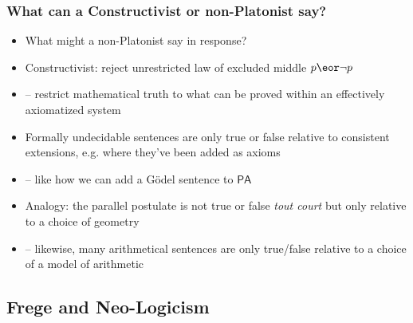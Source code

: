 


\begin{frame}
\frametitle{What can a Constructivist or non-Platonist say?}

\begin{itemize}[<+->]


\item What might a non-Platonist say in response?

\item Constructivist: reject unrestricted law of excluded middle $p \eor \neg p$
\item[] -- restrict mathematical truth to what can be proved within an effectively axiomatized system

\item Formally undecidable sentences are only true or false relative to consistent extensions, e.g. where they've been added as axioms

\item[] -- like how we can add a G\"odel sentence to $\mathsf{PA}$

\item Analogy: the parallel postulate is not true or false \textit{tout court} but only relative to a choice of geometry

\item[] -- likewise, many arithmetical sentences are only true/false relative to a choice of a model of arithmetic 

\end{itemize}
\end{frame}






 \iffalse %

\subsection{\phantom{v} Frege and Neo-Logicism} 

